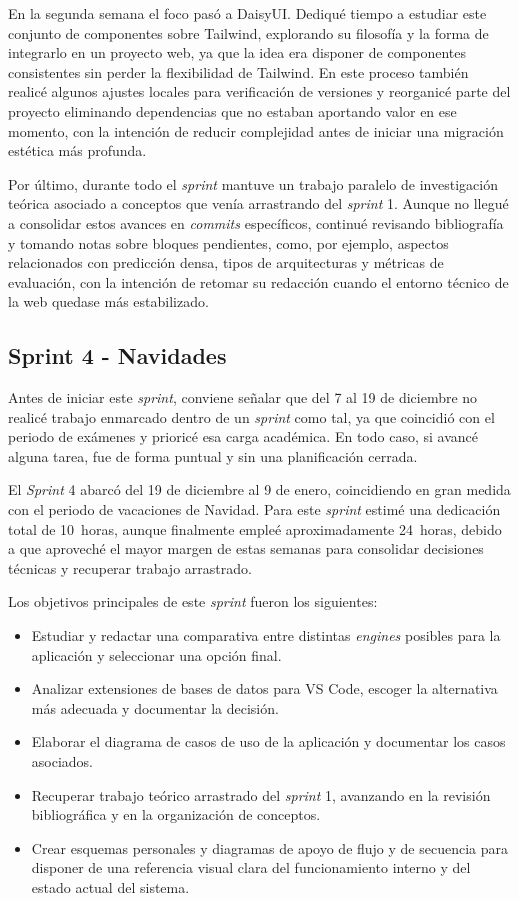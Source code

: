 En la segunda semana el foco pasó a DaisyUI. Dediqué tiempo a estudiar este conjunto de componentes sobre Tailwind, explorando su filosofía y la forma de integrarlo en un proyecto web, ya que la idea era disponer de componentes consistentes sin perder la flexibilidad de Tailwind. En este proceso también realicé algunos ajustes locales para verificación de versiones y reorganicé parte del proyecto eliminando dependencias que no estaban aportando valor en ese momento, con la intención de reducir complejidad antes de iniciar una migración estética más profunda.

Por último, durante todo el \textit{sprint} mantuve un trabajo paralelo de investigación teórica asociado a conceptos que venía arrastrando del \textit{sprint} 1. Aunque no llegué a consolidar estos avances en \textit{commits} específicos, continué revisando bibliografía y tomando notas sobre bloques pendientes, como, por ejemplo, aspectos relacionados con predicción densa, tipos de arquitecturas y métricas de evaluación, con la intención de retomar su redacción cuando el entorno técnico de la web quedase más estabilizado.

\subsection{Sprint 4 - Navidades}
Antes de iniciar este \textit{sprint}, conviene señalar que del 7 al 19 de diciembre no realicé trabajo enmarcado dentro de un \textit{sprint} como tal, ya que coincidió con el periodo de exámenes y prioricé esa carga académica. En todo caso, si avancé alguna tarea, fue de forma puntual y sin una planificación cerrada.

El \textit{Sprint} 4 abarcó del 19 de diciembre al 9 de enero, coincidiendo en gran medida con el periodo de vacaciones de Navidad. Para este \textit{sprint} estimé una dedicación total de 10~horas, aunque finalmente empleé aproximadamente 24~horas, debido a que aproveché el mayor margen de estas semanas para consolidar decisiones técnicas y recuperar trabajo arrastrado.

Los objetivos principales de este \textit{sprint} fueron los siguientes:
\begin{itemize}
	\item Estudiar y redactar una comparativa entre distintas \textit{engines} posibles para la aplicación y seleccionar una opción final.
	\item Analizar extensiones de bases de datos para VS Code, escoger la alternativa más adecuada y documentar la decisión.
	\item Elaborar el diagrama de casos de uso de la aplicación y documentar los casos asociados.
	\item Recuperar trabajo teórico arrastrado del \textit{sprint} 1, avanzando en la revisión bibliográfica y en la organización de conceptos.
	\item Crear esquemas personales y diagramas de apoyo de flujo y de secuencia para disponer de una referencia visual clara del funcionamiento interno y del estado actual del sistema.
\end{itemize}

